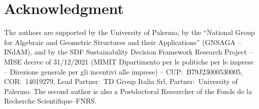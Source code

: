 \documentclass[11pt,a4paper]{amsart}
\theoremstyle{plain}
\theoremstyle{definition}
\theoremstyle{remark}
\numberwithin{equation}{section}
\newcommand{\0}{\emptyset}
\begin{document}

\section*{Acknowledgment}

The authors are supported by the University of Palermo, by the ``National Group for Algebraic and Geometric Structures and their Applications'' (GNSAGA -- INdAM), and by the SDF Sustainability Decision Framework Research Project -- MISE decree of 31/12/2021 (MIMIT Dipartimento per le politiche per le imprese -- Direzione generale per gli incentivi alle imprese) -- CUP:~B79J23000530005, COR:~14019279, Lead Partner:~TD Group Italia Srl, Partner:~University of Palermo. The second author is also a Postdoctoral Researcher of the Fonds de la Recherche Scientifique--FNRS.

%
%
%
%

\printbibliography
\end{document}
